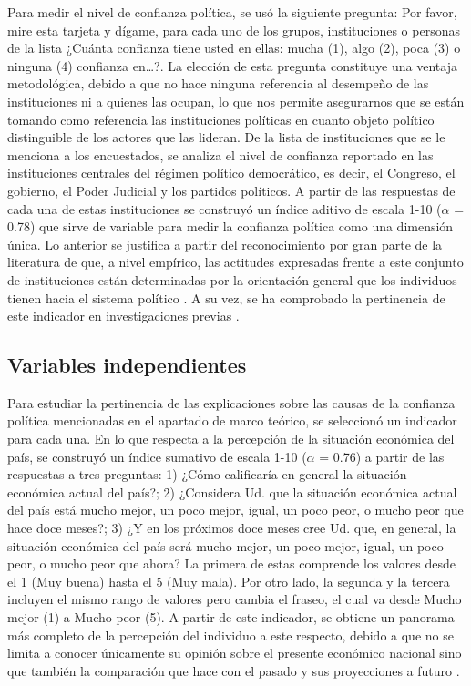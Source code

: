 \documentclass[12pt,twoside]{templates/facsothesis}
\begin{document}
Para medir el nivel de confianza política, se usó la siguiente pregunta: Por favor, mire esta tarjeta y dígame, para cada uno de los grupos, instituciones o personas de la lista ¿Cuánta confianza tiene usted en ellas: mucha (1), algo (2), poca (3) o ninguna (4) confianza en\ldots?. La elección de esta pregunta constituye una ventaja metodológica, debido a que no hace ninguna referencia al desempeño de las instituciones ni a quienes las ocupan, lo que nos permite asegurarnos que se están tomando como referencia las instituciones políticas en cuanto objeto político distinguible de los actores que las lideran. De la lista de instituciones que se le menciona a los encuestados, se analiza el nivel de confianza reportado en las instituciones centrales del régimen político democrático, es decir, el Congreso, el gobierno, el Poder Judicial y los partidos políticos. A partir de las respuestas de cada una de estas instituciones se construyó un índice aditivo de escala 1-10 (\(\alpha\) = 0.78) que sirve de variable para medir la confianza política como una dimensión única. Lo anterior se justifica a partir del reconocimiento por gran parte de la literatura de que, a nivel empírico, las actitudes expresadas frente a este conjunto de instituciones están determinadas por la orientación general que los individuos tienen hacia el sistema político \citep{marienMeasuringPoliticalTrust2013, zmerliPoliticalTrust2022}. A su vez, se ha comprobado la pertinencia de este indicador en investigaciones previas \citep{bargstedSocialPoliticalTrust2023, zmerliIncomeInequalityDistributive2015}.

\subsection{Variables independientes}\label{variables-independientes}

Para estudiar la pertinencia de las explicaciones sobre las causas de la confianza política mencionadas en el apartado de marco teórico, se seleccionó un indicador para cada una. En lo que respecta a la percepción de la situación económica del país, se construyó un índice sumativo de escala 1-10 (\(\alpha\) = 0.76) a partir de las respuestas a tres preguntas: 1) ¿Cómo calificaría en general la situación económica actual del país?; 2) ¿Considera Ud. que la situación económica actual del país está mucho mejor, un poco mejor, igual, un poco peor, o mucho peor que hace doce meses?; 3) ¿Y en los próximos doce meses cree Ud. que, en general, la situación económica del país será mucho mejor, un poco mejor, igual, un poco peor, o mucho peor que ahora? La primera de estas comprende los valores desde el 1 (Muy buena) hasta el 5 (Muy mala). Por otro lado, la segunda y la tercera incluyen el mismo rango de valores pero cambia el fraseo, el cual va desde Mucho mejor (1) a Mucho peor (5). A partir de este indicador, se obtiene un panorama más completo de la percepción del individuo a este respecto, debido a que no se limita a conocer únicamente su opinión sobre el presente económico nacional sino que también la comparación que hace con el pasado y sus proyecciones a futuro \citep{saldanazunigaConfianzaInstitucionesPoliticas2019}.
\end{document}
